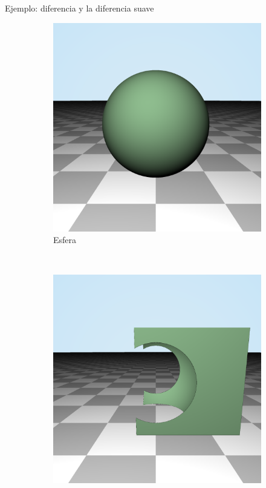 \begin{frame}[fragile]{Ejemplo: diferencia y la diferencia suave}
\begin{figure}[htp]
\begin{subfigure}[b]{0.2\textwidth}
   \includegraphics[width=\textwidth]{img/RightSphere}
   \caption{Esfera}
 \end{subfigure}
~
 \begin{subfigure}[b]{0.2\textwidth}
   \includegraphics[width=\textwidth]{img/Substraction}

\end{subfigure}
\end{figure}
\end{frame}
